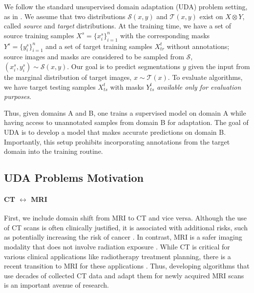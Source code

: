 

We follow the standard unsupervised domain adaptation (UDA) problem setting, as in \cite{dann}. We assume that two distributions $\mathcal{S}(x, y)$ and $\mathcal{T}(x, y)$ exist on $X \otimes Y$, called \textit{source} and \textit{target} distributions. At the training time, we have a set of source training samples $X^s = \{ x_i^s \}_{i=1}^n$ with the corresponding masks $Y^s = \{ y_i^s \}_{i=1}^n$ and a set of target training samples $X^t_{tr}$ without annotations; source images and masks are considered to be sampled from $\mathcal{S}$, $(x_i^s, y_i^s) \sim \mathcal{S}(x, y)$. Our goal is to predict segmentations $y$ given the input from the marginal distribution of target images, $x \sim \mathcal{T}(x)$. To evaluate algorithms, we have target testing samples $X^t_{ts}$ with masks $Y^t_{ts}$ \textit{available only for evaluation purposes}.

Thus, given domains A and B, one trains a supervised model on domain A while having access to unannotated samples from domain B for adaptation. The goal of UDA is to develop a model that makes accurate predictions on domain B. Importantly, this setup prohibits incorporating annotations from the target domain into the training routine.



\subsection{UDA Problems Motivation}





\paragraph{CT \textbf{$\leftrightarrow$} MRI}

First, we include domain shift from MRI to CT and vice versa. Although the use of CT scans is often clinically justified, it is associated with additional risks, such as 
potentially increasing the risk of cancer \cite{cao2022ct,brenner2007computed}. In contrast, MRI is a safer imaging modality that does not involve radiation exposure \cite{nie2016estimating}. While CT is critical for various clinical applications like radiotherapy treatment planning, there is a recent transition to MRI for these applications \cite{paczona2023magnetic}. Thus, developing algorithms that use decades of collected CT data and adapt them for newly acquired MRI scans is an important avenue of research.

